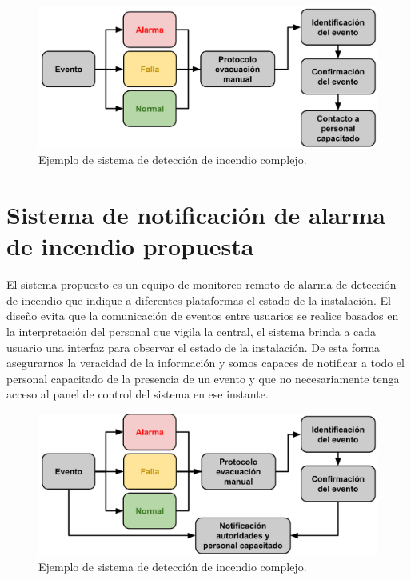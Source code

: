 \begin{figure}[h]
	\centering
	\includegraphics[scale=.4]{./Figures/Capitulo1/FIG_B1.png}
	\caption{Ejemplo de sistema de detección de incendio complejo.}
	\label{fig:figura_a2}
\end{figure}

\section{Sistema de notificación de alarma de incendio propuesta}

El sistema propuesto es un equipo de monitoreo remoto de alarma de detección de incendio que indique a diferentes plataformas el estado de la instalación. El diseño evita que la comunicación de eventos entre usuarios se realice basados en la interpretación del personal que vigila la central, el sistema brinda a cada usuario  una interfaz para observar el estado de la instalación. De esta forma asegurarnos la veracidad de la información y somos capaces de notificar a todo el personal capacitado de la presencia de un evento y que no necesariamente tenga acceso al panel de control del sistema en ese instante.

\begin{figure}[h]
	\centering
	\includegraphics[scale=.4]{./Figures/Capitulo1/FIG_C1.png}
	\caption{Ejemplo de sistema de detección de incendio complejo.}
	\label{fig:figura_a3}
\end{figure}

